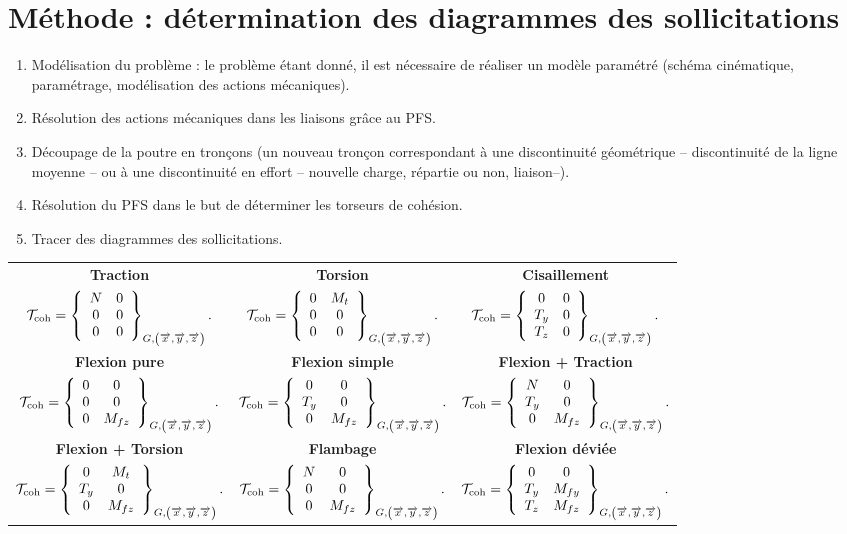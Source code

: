 \documentclass[10pt,fleqn]{article} %
\begin{document}
\section{Méthode : détermination des diagrammes des sollicitations}
\begin{enumerate}
\item Modélisation du problème : le problème étant donné, il est nécessaire de réaliser un modèle paramétré (schéma cinématique, paramétrage, modélisation des actions mécaniques). 
\item Résolution des actions mécaniques dans les liaisons grâce au PFS. 
\item Découpage de la poutre en tronçons (un nouveau tronçon correspondant à une discontinuité géométrique -- discontinuité de la ligne moyenne -- ou à une discontinuité en effort -- nouvelle charge, répartie ou non, liaison--).
\item Résolution du PFS dans le but de déterminer les torseurs de cohésion.
\item Tracer des diagrammes des sollicitations.
\end{enumerate}

\begin{center}
\begin{tabular}{|c|c|c|}
\hline
\textbf{Traction} & \textbf{Torsion} & \textbf{Cisaillement} \\
$
\mathcal{T}_{\text{coh}} = \torseurcol{N}{0}{0}{0}{0}{0}{G,\left(\vx{}, \vy{}, \vz{} \right)}.
$
&
$
\mathcal{T}_{\text{coh}} = \torseurcol{0}{0}{0}{M_t}{0}{0}{G,\left(\vx{}, \vy{}, \vz{} \right)}.
$
&
$
\mathcal{T}_{\text{coh}} = \torseurcol{0}{T_y}{T_z}{0}{0}{0}{G,\left(\vx{}, \vy{}, \vz{} \right)}.
$ \\
\hline
\hline
\textbf{Flexion pure} & \textbf{Flexion simple} & \textbf{Flexion + Traction} \\
$
\mathcal{T}_{\text{coh}} = \torseurcol{0}{0}{0}{0}{0}{M_{fz}}{G,\left(\vx{}, \vy{}, \vz{} \right)}.
$
&
$
\mathcal{T}_{\text{coh}} = \torseurcol{0}{T_y}{0}{0}{0}{M_{fz}}{G,\left(\vx{}, \vy{}, \vz{} \right)}.
$
&
$
\mathcal{T}_{\text{coh}} = \torseurcol{N}{T_y}{0}{0}{0}{M_{fz}}{G,\left(\vx{}, \vy{}, \vz{} \right)}.
$ \\
\hline
\hline
\textbf{Flexion + Torsion} & \textbf{Flambage} & \textbf{Flexion déviée} \\
$
\mathcal{T}_{\text{coh}} = \torseurcol{0}{T_y}{0}{M_t}{0}{M_{fz}}{G,\left(\vx{}, \vy{}, \vz{} \right)}.
$
&
$
\mathcal{T}_{\text{coh}} = \torseurcol{N}{0}{0}{0}{0}{M_{fz}}{G,\left(\vx{}, \vy{}, \vz{} \right)}.
$
&
$
\mathcal{T}_{\text{coh}} = \torseurcol{0}{T_y}{T_z}{0}{M_{fy}}{M_{fz}}{G,\left(\vx{}, \vy{}, \vz{} \right)}.
$ \\
\hline
\end{tabular}
\end{center}
\end{document}
